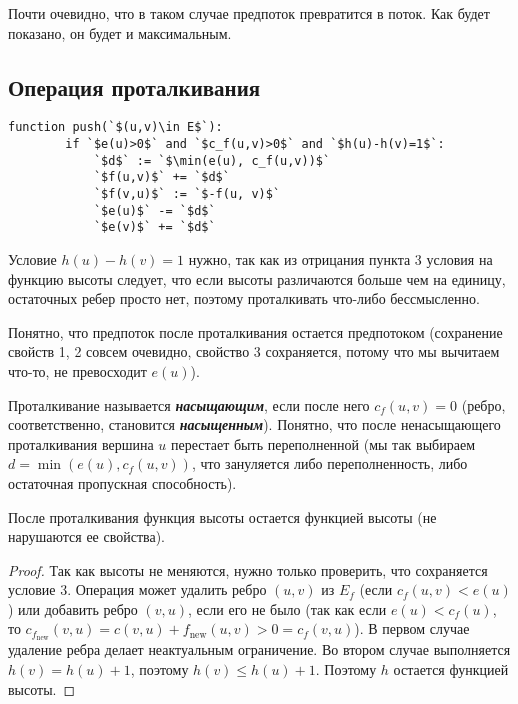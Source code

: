 Почти очевидно, что в таком случае предпоток превратится в поток. Как будет показано, он будет и максимальным.

\subsection{Операция проталкивания}
\begin{lstlisting}[escapeinside=``]
	function push(`$(u,v)\in E$`):
		if `$e(u)>0$` and `$c_f(u,v)>0$` and `$h(u)-h(v)=1$`:
			`$d$` := `$\min(e(u), c_f(u,v))$`
			`$f(u,v)$` += `$d$`
			`$f(v,u)$` := `$-f(u, v)$`
			`$e(u)$` -= `$d$`
			`$e(v)$` += `$d$`
\end{lstlisting}
Условие $h(u)-h(v)=1$ нужно, так как из отрицания пункта 3 условия на функцию высоты следует, что если высоты различаются больше чем на единицу, остаточных ребер просто нет, поэтому проталкивать что-либо бессмысленно.

Понятно, что предпоток после проталкивания остается предпотоком (сохранение свойств 1, 2 совсем очевидно, свойство 3 сохраняется, потому что мы вычитаем что-то, не превосходит $e(u)$\label{someshit7}).

Проталкивание называется {\bf\it насыщающим}, если после него $c_f(u,v)=0$ (ребро, соответственно, становится {\bf\it насыщенным}). Понятно, что после ненасыщающего проталкивания вершина $u$ перестает быть переполненной (мы так выбираем $d=\min(e(u), c_f(u,v))$, что зануляется либо переполненность, либо остаточная пропускная способность).

\begin{lemma}
	После проталкивания функция высоты остается функцией высоты (не нарушаются ее свойства).
\end{lemma}
\begin{proof}
	Так как высоты не меняются, нужно только проверить, что сохраняется условие 3. Операция может удалить ребро $(u,v)$ из $E_f$ (если $c_f(u,v)<e(u)$) или добавить ребро $(v,u)$, если его не было (так как если $e(u)<c_f(u)$, то $c_{f_\mathrm{new}}(v,u)=c(v,u)+f_\mathrm{new}(u,v)>0=c_f(v,u)$). В первом случае удаление ребра делает неактуальным ограничение. Во втором случае выполняется $h(v)=h(u)+1$, поэтому $h(v)\le h(u)+1$. Поэтому $h$ остается функцией высоты.
\end{proof}
